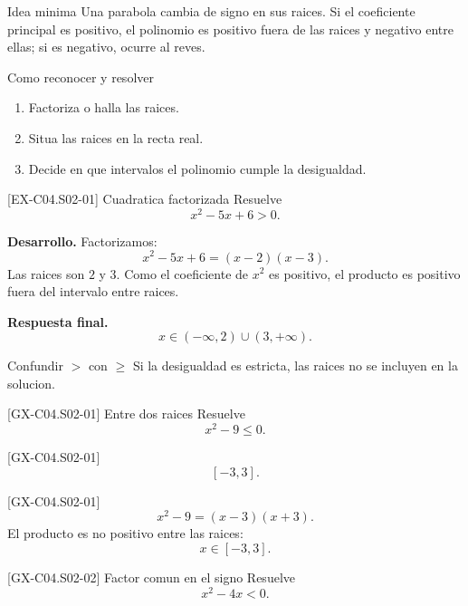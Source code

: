 \begin{theorybox}{Idea minima}
Una parabola cambia de signo en sus raices. Si el coeficiente principal es positivo, el
polinomio es positivo fuera de las raices y negativo entre ellas; si es negativo, ocurre al
reves.
\end{theorybox}

\begin{methodbox}{Como reconocer y resolver}
\begin{enumerate}
  \item Factoriza o halla las raices.
  \item Situa las raices en la recta real.
  \item Decide en que intervalos el polinomio cumple la desigualdad.
\end{enumerate}
\end{methodbox}

\begin{solvedexample}{[EX-C04.S02-01] Cuadratica factorizada}
Resuelve
\[
x^2-5x+6>0.
\]

\textbf{Desarrollo.} Factorizamos:
\[
x^2-5x+6=(x-2)(x-3).
\]
Las raices son \(2\) y \(3\). Como el coeficiente de \(x^2\) es positivo, el producto es
positivo fuera del intervalo entre raices.

\textbf{Respuesta final.}
\[
x\in (-\infty,2)\cup (3,+\infty).
\]
\end{solvedexample}

\begin{commonerror}{Confundir \(>\) con \(\geq\)}
Si la desigualdad es estricta, las raices no se incluyen en la solucion.
\end{commonerror}

\begin{guidedexercise}{[GX-C04.S02-01] Entre dos raices}
Resuelve
\[
x^2-9\leq 0.
\]
\end{guidedexercise}

\begin{shortanswer}{[GX-C04.S02-01]}
\[
[-3,3].
\]
\end{shortanswer}

\begin{fullsolution}{[GX-C04.S02-01]}
\[
x^2-9=(x-3)(x+3).
\]
El producto es no positivo entre las raices:
\[
x\in [-3,3].
\]
\end{fullsolution}

\begin{guidedexercise}{[GX-C04.S02-02] Factor comun en el signo}
Resuelve
\[
x^2-4x<0.
\]
\end{guidedexercise}

